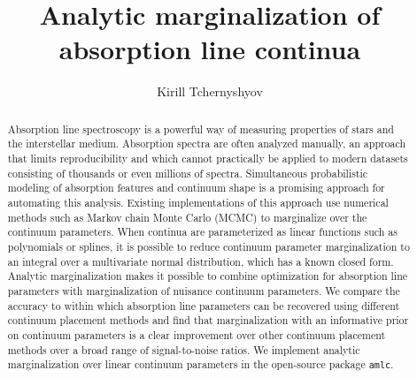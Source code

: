 \documentclass[manuscript]{aastex62}
\newcommand{\pkgname}{\texttt{amlc}}
\begin{document}
\title{Analytic marginalization of absorption line continua}

\author[0000-0003-0789-9939]{Kirill Tchernyshyov}

\begin{abstract}
Absorption line spectroscopy is a powerful way of measuring properties of stars and the interstellar medium.
Absorption spectra are often analyzed manually, an approach that limits reproducibility and which cannot practically be applied to modern datasets consisting of thousands or even millions of spectra.
Simultaneous probabilistic modeling of absorption features and continuum shape is a promising approach for automating this analysis.
Existing implementations of this approach use numerical methods such as Markov chain Monte Carlo (MCMC) to marginalize over the continuum parameters.
When continua are parameterized as linear functions such as polynomials or splines, it is possible to reduce continuum parameter marginalization to an integral over a multivariate normal distribution, which has a known closed form.
Analytic marginalization makes it possible to combine optimization for absorption line parameters with marginalization of nuisance continuum parameters.
We compare the accuracy to within which absorption line parameters can be recovered using different continuum placement methods and find that marginalization with an informative prior on continuum parameters is a clear improvement over other continuum placement methods over a broad range of signal-to-noise ratios.
We implement analytic marginalization over linear continuum parameters in the open-source package \pkgname.
\end{abstract}

\end{document}
